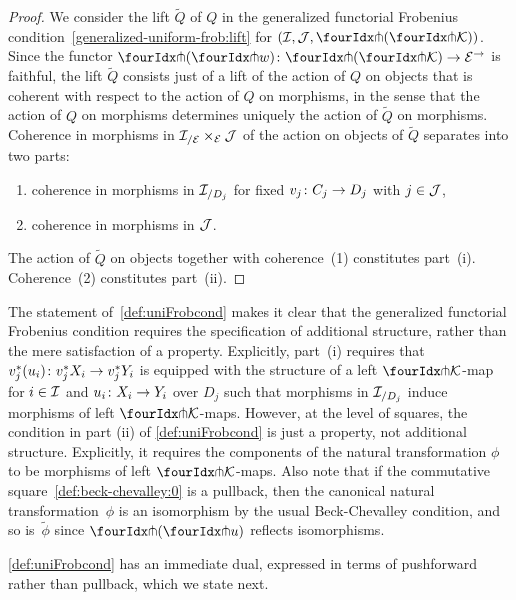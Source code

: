 \documentclass[reqno,10pt,a4paper,oneside,draft]{amsart}
\begin{document}
{{\begin{proof}
We consider the lift $\widetilde{Q}$ of $Q$ in the generalized functorial Frobenius condition~\eqref{generalized-uniform-frob:lift} for $(\cal{I}, \cal{J}, \liftl{(\liftr{\cal{K}})})$.
Since the functor $\liftl{(\liftr{w})} \co \liftl{(\liftr{\cal{K}})} \to \cal{E}^\to$ is faithful, the lift $\widetilde{Q}$ consists just of a lift of the action of $Q$ on objects that is coherent with respect to the action of $Q$ on morphisms, in the sense that the action of $Q$ on morphisms determines uniquely the action of $\widetilde{Q}$ on morphisms.
Coherence in morphisms in $\cal{I}_{/\cal{E}} \times_{\cal{E}} \cal{J}$ of the action on objects of $\widetilde{Q}$ separates into two parts:
\begin{enumerate}[(1)]
\item coherence in morphisms in $\cal{I}_{/D_j}$ for fixed $v_j \co C_j \to D_j$ with $j \in \cal{J}$,
\item coherence in morphisms in $\cal{J}$.
\end{enumerate}
The action of $\widetilde{Q}$ on objects together with coherence~(1) constitutes part~(i).
Coherence~(2) constitutes part~(ii).
\end{proof}

The statement of~\cref{def:uniFrobcond} makes it clear that the generalized functorial Frobenius condition requires the specification of additional structure, rather than the mere satisfaction of a property.
Explicitly, part~(i) requires that $v_j^*(u_i) \co v_j^* X_i \to v_j^* Y_i$ is equipped with the structure of a left $\liftr{\cal{K}}$-map for $i \in \cal{I}$ and $u_i \co X_i \to Y_i$ over $D_j$ such that morphisms in $\cal{I}_{/D_j}$ induce morphisms of left $\liftr{\cal{K}}$-maps.
However, at the level of squares, the condition in part (ii) of \cref{def:uniFrobcond} is just a property, not additional structure.
Explicitly, it requires the components of the natural transformation $\phi$ to be morphisms of left $\liftr{\cal{K}}$-maps.
Also note that if the commutative square~\eqref{def:beck-chevalley:0} is a pullback, then the canonical natural transformation~$\phi$ is an isomorphism by the usual Beck-Chevalley condition, and so is~$\tilde{\phi}$ since $\liftl{(\liftr{u})}$ reflects isomorphisms.

\cref{def:uniFrobcond} has an immediate dual, expressed in terms of pushforward rather than pullback, which we state next.

}}
\end{document}
